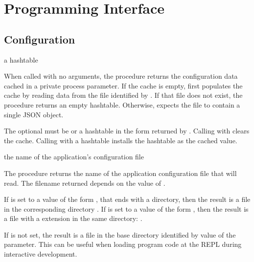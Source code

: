 \section {Programming Interface}

\subsection{Configuration}

\begin{procedure}
\end{procedure}
\returns{} a hashtable

When called with no arguments, the  procedure
returns the configuration data cached in a private process parameter.
If the cache is empty,  first populates the cache by reading
data from the file identified by .
If that file does not exist, the procedure returns an empty hashtable.
Otherwise,  expects the file to contain a single JSON object.

The optional  must be  or a hashtable in the form returned by
.
Calling  with  clears the cache.
Calling  with a hashtable installs the hashtable as the cached value.

\begin{procedure}
\end{procedure}
\returns{} the name of the application's configuration file

The  procedure returns the name of the application
configuration file that  will read.
The filename returned depends on the value of .

If  is set to a value of the form
,
that ends with a  directory,
then the result is a  file in the corresponding  directory
.
If  is set to a value of the form
,
then the result is a file with a  extension in the same directory:
.

If  is not set, the result is a  file in the base
directory identified by value of the  parameter.
This can be useful when loading program code at the REPL during interactive
development.

